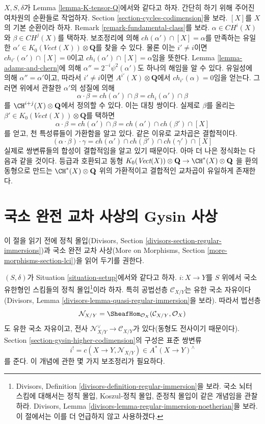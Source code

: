 \noindent
$X, S, \delta$가 Lemma \ref{lemma-K-tensor-Q}에서와 같다고 하자.
간단히 하기 위해 주어진 여차원의 순환들로 작업하자. Section
\ref{section-cycles-codimension}을 보라. $[X]$를 $X$의 기본 순환이라
하자. Remark \ref{remark-fundamental-class}를 보라.
$\alpha \in CH^i(X)$와 $\beta \in CH^j(X)$를 택하자. 보조정리에 의해
$ch(\alpha') \cap [X]  = \alpha$를 만족하는 유일한
$\alpha' \in K_0(\textit{Vect}(X)) \otimes \mathbf{Q}$를 찾을 수 있다.
물론 이는 $i' \not = i$이면 $ch_{i'}(\alpha') \cap [X] = 0$이고
$ch_i(\alpha') \cap [X] = \alpha$임을 뜻한다. Lemma
\ref{lemma-adams-and-chern}에 의해
$\alpha'' = 2^{-i}\psi^2(\alpha')$도 하나의 해임을 알 수 있다.
유일성에 의해 $\alpha'' = \alpha'$이고, 따라서 $i' \not = i$이면
$A^{i'}(X) \otimes \mathbf{Q}$에서 $ch_{i'}(\alpha) = 0$임을 얻는다.
그러면 위에서 관찰한 $\alpha'$의 성질에 의해
$$
\alpha \cdot \beta = ch(\alpha') \cap \beta =
ch_i(\alpha') \cap \beta
$$
를 $\CH^{i + j}(X) \otimes \mathbf{Q}$에서 정의할 수 있다. 이는 대칭
쌍이다. 실제로 $\beta$를 올리는
$\beta' \in K_0(\textit{Vect}(X)) \otimes \mathbf{Q}$를 택하면
$$
\alpha \cdot \beta = ch(\alpha') \cap \beta =
ch(\alpha') \cap ch(\beta') \cap [X]
$$
를 얻고, 천 특성류들이 가환함을 알고 있다. 같은 이유로 교차곱은
결합적이다.
$$
(\alpha \cdot \beta) \cdot \gamma =
ch(\alpha') \cap ch(\beta') \cap ch(\gamma') \cap [X]
$$
실제로 쌍변류들의 합성이 결합적임을 알고 있기 때문이다. 아마 더
나은 정식화는 다음과 같을 것이다. 등급과 호환되고 동형
$K_0(\textit{Vect}(X)) \otimes \mathbf{Q} \to \CH^*(X) \otimes \mathbf{Q}$
을 환의 동형으로 만드는 $\CH^*(X) \otimes \mathbf{Q}$ 위의 가환적이고
결합적인 교차곱이 유일하게 존재한다.






\section{국소 완전 교차 사상의 Gysin 사상}
\label{section-koszul}

\noindent
이 절을 읽기 전에 정칙 몰입(Divisors, Section
\ref{divisors-section-regular-immersions})과 국소 완전 교차 사상(More
on Morphisms, Section \ref{more-morphisms-section-lci})을 읽어 두기를
권한다.

\medskip\noindent
$(S, \delta)$가 Situation \ref{situation-setup}에서와 같다고 하자.
$i : X \to Y$를 $S$ 위에서 국소 유한형인 스킴들의 정칙
몰입\footnote{Divisors, Definition
\ref{divisors-definition-regular-immersion}을 보라. 국소 뇌터 스킴에
대해서는 정칙 몰입, Koszul-정칙 몰입, 준정칙 몰입이 같은 개념임을
관찰하라. Divisors, Lemma
\ref{divisors-lemma-regular-immersion-noetherian}을 보라. 이 절에서는
이를 더 언급하지 않고 사용하겠다.}이라 하자. 특히 공법선층
$\mathcal{C}_{X/Y}$는 유한 국소 자유이다(Divisors, Lemma
\ref{divisors-lemma-quasi-regular-immersion}을 보라). 따라서 법선층
$$
\mathcal{N}_{X/Y} = \SheafHom_{\mathcal{O}_X}(\mathcal{C}_{X/Y}, \mathcal{O}_X)
$$
도 유한 국소 자유이고, 전사
$\mathcal{N}_{X/Y}^\vee \to \mathcal{C}_{X/Y}$가 있다(동형도
전사이기 때문이다). Section \ref{section-gysin-higher-codimension}의
구성은 표준 쌍변류
$$
i^! = c(X \to Y, \mathcal{N}_{X/Y}) \in A^*(X \to Y)^\wedge
$$
를 준다. 이 개념에 관한 몇 가지 보조정리가 필요하다.

